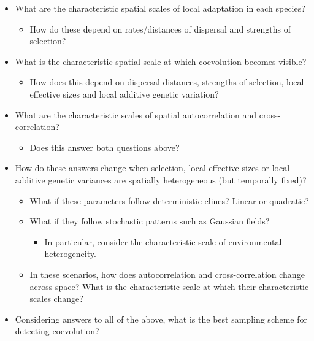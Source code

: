\documentclass{article}
\begin{document}
\begin{itemize}
\tightlist
\item
  What are the characteristic spatial scales of local adaptation in each
  species?

  \begin{itemize}
  \tightlist
  \item
    How do these depend on rates/distances of dispersal and strengths of
    selection?
  \end{itemize}
\item
  What is the characteristic spatial scale at which coevolution becomes
  visible?

  \begin{itemize}
  \tightlist
  \item
    How does this depend on dispersal distances, strengths of selection,
    local effective sizes and local additive genetic variation?
  \end{itemize}
\item
  What are the characteristic scales of spatial autocorrelation and
  cross-correlation?

  \begin{itemize}
  \tightlist
  \item
    Does this answer both questions above?
  \end{itemize}
\item
  How do these answers change when selection, local effective sizes or
  local additive genetic variances are spatially heterogeneous (but
  temporally fixed)?

  \begin{itemize}
  \tightlist
  \item
    What if these parameters follow deterministic clines? Linear or
    quadratic?
  \item
    What if they follow stochastic patterns such as Gaussian fields?

    \begin{itemize}
    \tightlist
    \item
      In particular, consider the characteristic scale of environmental
      heterogeneity.
    \end{itemize}
  \item
    In these scenarios, how does autocorrelation and cross-correlation
    change across space? What is the characteristic scale at which their
    characteristic scales change?
  \end{itemize}
\item
  Considering answers to all of the above, what is the best sampling
  scheme for detecting coevolution?


\end{itemize}
\end{document}
